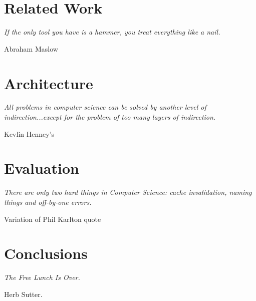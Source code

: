 \documentclass[12pt,openright,twoside]{report}
\newcommand{\LIMPA}{
\newpage
\mbox{}
\thispagestyle{empty}
}
\begin{document}
\LIMPA

\begingroup
\renewcommand{\cleardoublepage}{}
\renewcommand{\clearpage}{}
\chapter{Related Work}\label{chapter:2}
\endgroup
\setlength{\epigraphwidth}{0.4\textwidth}
\epigraph{\emph{If the only tool you have is a hammer, you treat everything like a nail.}}{Abraham Maslow}
\glsresetall


\LIMPA
\begingroup
\renewcommand{\cleardoublepage}{}
\renewcommand{\clearpage}{}
\chapter{Architecture}\label{chapter:3}
\endgroup
\epigraph{\emph{All problems in computer science can be solved by another level of indirection...except for the problem of too many layers of indirection.}}{Kevlin Henney's}
\glsresetall


\LIMPA
\begingroup
\renewcommand{\cleardoublepage}{}
\renewcommand{\clearpage}{}
\chapter{Evaluation}\label{chapter:4}
\setlength{\epigraphwidth}{0.6\textwidth}
\epigraph{\emph{There are only two hard things in Computer Science:
    cache invalidation, naming things and off-by-one
    errors.}}{Variation of Phil Karlton quote}
\endgroup


\glsresetall
 

\LIMPA
\begingroup
\renewcommand{\cleardoublepage}{}
\renewcommand{\clearpage}{}
\chapter{Conclusions}\label{chapter:5}
\endgroup
\setlength{\epigraphwidth}{0.25\textwidth}
\epigraph{\emph{The Free Lunch Is Over.}}{Herb Sutter.}
\end{document}
